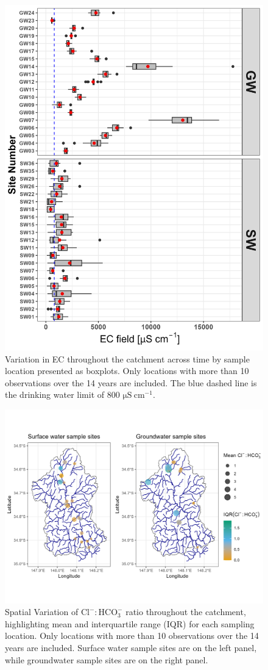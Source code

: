 \documentclass[, manuscript]{copernicus}
\begin{document}
\begin{figure}
\includegraphics[width=0.8\linewidth]{Figures/ec_plot} \caption{Variation in EC throughout the catchment across time by sample location presented as boxplots. Only locations with more than 10 observations over the 14 years are included. The blue dashed line is the drinking water limit of 800 $\mathrm{\mu S~cm^{-1}}$.}\label{fig:ECboxplot}
\end{figure}

\clearpage

\begin{figure}
\includegraphics[width=0.8\linewidth]{Figures/clhco3_map} \caption{Spatial Variation of $\mathrm{Cl^-:HCO_3^-}$ ratio throughout the catchment, highlighting mean and interquartile range (IQR) for each sampling location. Only locations with more than 10 observations over the 14 years are included. Surface water sample sites are on the left panel, while groundwater sample sites are on the right panel.}\label{fig:Carbonate-map}
\end{figure}
\end{document}
